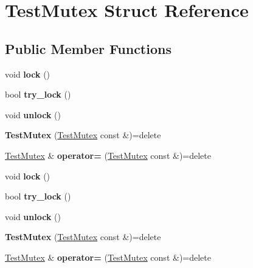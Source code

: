 \hypertarget{struct_test_mutex}{}\section{Test\+Mutex Struct Reference}
\label{struct_test_mutex}
\subsection*{Public Member Functions}
\begin{DoxyCompactItemize}
\item 
\mbox{\label{struct_test_mutex_ac6020b90be7c7443ed6b80390a0c1e5e}} 
void {\bfseries lock} ()
\item 
\mbox{\label{struct_test_mutex_ab30322a97bbcfc927e01021f5cb9afa3}} 
bool {\bfseries try\+\_\+lock} ()
\item 
\mbox{\label{struct_test_mutex_abdb741ed3fcf42937010ced70a578657}} 
void {\bfseries unlock} ()
\item 
\mbox{\label{struct_test_mutex_ac8b8179188124e20161858866383702d}} 
{\bfseries Test\+Mutex} (\mbox{\hyperlink{struct_test_mutex}{Test\+Mutex}} const \&)=delete
\item 
\mbox{\label{struct_test_mutex_a7b55759c95b5b323d35bda3da926a2ae}} 
\mbox{\hyperlink{struct_test_mutex}{Test\+Mutex}} \& {\bfseries operator=} (\mbox{\hyperlink{struct_test_mutex}{Test\+Mutex}} const \&)=delete
\item 
\mbox{\label{struct_test_mutex_ac6020b90be7c7443ed6b80390a0c1e5e}} 
void {\bfseries lock} ()
\item 
\mbox{\label{struct_test_mutex_ab30322a97bbcfc927e01021f5cb9afa3}} 
bool {\bfseries try\+\_\+lock} ()
\item 
\mbox{\label{struct_test_mutex_abdb741ed3fcf42937010ced70a578657}} 
void {\bfseries unlock} ()
\item 
\mbox{\label{struct_test_mutex_ac8b8179188124e20161858866383702d}} 
{\bfseries Test\+Mutex} (\mbox{\hyperlink{struct_test_mutex}{Test\+Mutex}} const \&)=delete
\item 
\mbox{\label{struct_test_mutex_a7b55759c95b5b323d35bda3da926a2ae}} 
\mbox{\hyperlink{struct_test_mutex}{Test\+Mutex}} \& {\bfseries operator=} (\mbox{\hyperlink{struct_test_mutex}{Test\+Mutex}} const \&)=delete
\end{DoxyCompactItemize}
